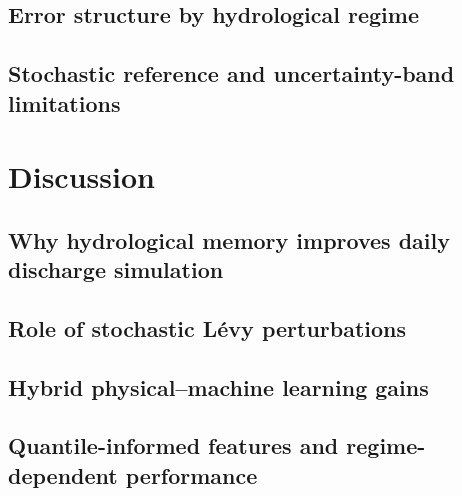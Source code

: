 \documentclass[preprint,12pt]{elsarticle}
\begin{document}

\subsection{Error structure by hydrological regime}

\subsection{Stochastic reference and uncertainty-band limitations}

\section{Discussion}

\subsection{Why hydrological memory improves daily discharge simulation}

\subsection{Role of stochastic Lévy perturbations}

\subsection{Hybrid physical--machine learning gains}

\subsection{Quantile-informed features and regime-dependent performance}
\end{document}
